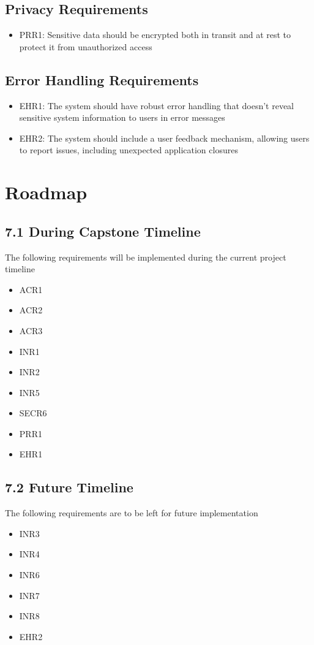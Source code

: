 \documentclass{article}
\begin{document}
    \subsection{Privacy Requirements}
    \begin{itemize}
        \item PRR1: Sensitive data should be encrypted both in transit and at rest to protect it from unauthorized access
    \end{itemize}

    \subsection{Error Handling Requirements}
    \begin{itemize}
        \item EHR1: The system should have robust error handling that doesn't reveal sensitive system information to users in error messages
        \item EHR2: The system should include a user feedback mechanism, allowing users to report issues, including unexpected application closures
    \end{itemize}

    \section{Roadmap}

    \subsection*{7.1 During Capstone Timeline}
    The following requirements will be implemented during the current project timeline
    \begin{itemize}
        \item ACR1
        \item ACR2
        \item ACR3
        \item INR1
        \item INR2
        \item INR5
        \item SECR6
        \item PRR1
        \item EHR1
    \end{itemize}

    \subsection*{7.2 Future Timeline}
    The following requirements are to be left for future implementation
    \begin{itemize}
        \item INR3
        \item INR4
        \item INR6
        \item INR7
        \item INR8
        \item EHR2
    \end{itemize}
\end{document}
